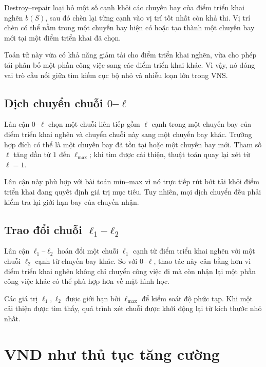 Destroy--repair loại bỏ một số cạnh khỏi các chuyến bay của điểm triển khai nghẽn \(b(S)\), sau đó chèn lại từng cạnh vào vị trí tốt nhất còn khả thi. Vị trí chèn có thể nằm trong một chuyến bay hiện có hoặc tạo thành một chuyến bay mới tại một điểm triển khai đã chọn.

Toán tử này vừa có khả năng giảm tải cho điểm triển khai nghẽn, vừa cho phép tái phân bố một phần công việc sang các điểm triển khai khác. Vì vậy, nó đóng vai trò cầu nối giữa tìm kiếm cục bộ nhỏ và nhiễu loạn lớn trong VNS.

\subsection{Dịch chuyển chuỗi \(0\)--\(\ell\)}
\label{subsec:vns-zero-l}

Lân cận \(0\)--\(\ell\) chọn một chuỗi liên tiếp gồm \(\ell\) cạnh trong một chuyến bay của điểm triển khai nghẽn và chuyển chuỗi này sang một chuyến bay khác. Trường hợp đích có thể là một chuyến bay đã tồn tại hoặc một chuyến bay mới. Tham số \(\ell\) tăng dần từ \(1\) đến \(\ell_{\max}\); khi tìm được cải thiện, thuật toán quay lại xét từ \(\ell=1\).

Lân cận này phù hợp với bài toán min--max vì nó trực tiếp rút bớt tải khỏi điểm triển khai đang quyết định giá trị mục tiêu. Tuy nhiên, mọi dịch chuyển đều phải kiểm tra lại giới hạn bay của chuyến nhận.

\subsection{Trao đổi chuỗi \(\ell_1\)--\(\ell_2\)}
\label{subsec:vns-l1-l2}

Lân cận \(\ell_1\)--\(\ell_2\) hoán đổi một chuỗi \(\ell_1\) cạnh từ điểm triển khai nghẽn với một chuỗi \(\ell_2\) cạnh từ chuyến bay khác. So với \(0\)--\(\ell\), thao tác này cân bằng hơn vì điểm triển khai nghẽn không chỉ chuyển công việc đi mà còn nhận lại một phần công việc khác có thể phù hợp hơn về mặt hình học.

Các giá trị \(\ell_1,\ell_2\) được giới hạn bởi \(\ell_{\max}\) để kiểm soát độ phức tạp. Khi một cải thiện được tìm thấy, quá trình xét chuỗi được khởi động lại từ kích thước nhỏ nhất.

\section{VND như thủ tục tăng cường}
\label{sec:vns-vnd}

